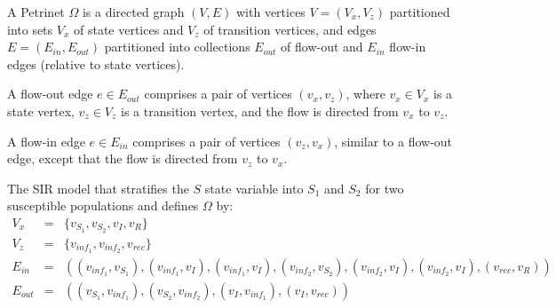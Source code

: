 \begin{definition}
    A Petrinet $\Omega$ is a directed graph $(V, E)$ with vertices $V=(V_x,
    V_z)$ partitioned into sets $V_x$ of state vertices and $V_z$ of transition
    vertices, and edges $E=(E_{in}, E_{out})$ partitioned into collections $E_{out}$ of
    flow-out and $E_{in}$ flow-in edges (relative to state vertices). 
\end{definition}



\begin{definition}
A flow-out edge $e \in E_{out}$ comprises a pair of vertices $(v_x,v_z)$, where
$v_x \in V_x$ is a state vertex, $v_z \in V_z$ is a transition vertex, and the
flow is directed from $v_x$ to $v_z$.  
\end{definition}

\begin{definition}
    A flow-in edge $e \in E_{in}$ comprises a pair of vertices $(v_z,v_x)$,
    similar to a flow-out edge, except that the flow is directed from $v_z$ to
    $v_x$.  
\end{definition}

\begin{example}
    The SIR model that stratifies the $S$ state variable into $S_1$ and $S_2$
    for two susceptible populations and defines $\Omega$ by:
    \begin{eqnarray*}
        V_x &=& \{v_{S_1}, v_{S_2}, v_{I}, v_{R}\}\\
        V_z &=& \{v_{inf_1}, v_{inf_2}, v_{rec}\}\\
        E_{in} &=& ((v_{inf_1}, v_{S_1}), (v_{inf_1}, v_{I}), (v_{inf_1}, v_{I}), (v_{inf_2}, v_{S_2}), (v_{inf_2}, v_{I}),
        (v_{inf_2}, v_{I}), (v_{rec}, v_{R}))\\
        E_{out} &=& ((v_{S_1}, v_{inf_1}), (v_{S_2}, v_{inf_2}),(v_{I}, v_{inf_1}), (v_{I}, v_{rec}))
    \end{eqnarray*}
\end{example}

